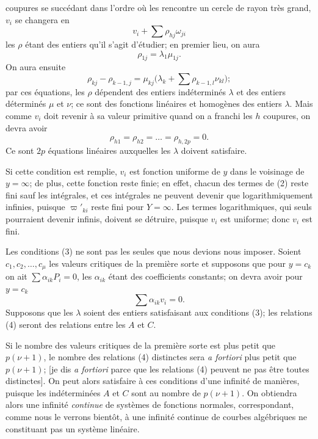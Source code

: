 \documentclass{article}
\begin{document}
coupures se succédant dans l'ordre où les rencontre un cercle de rayon très grand, $v_{i}$ se changera en
\[
v_{i} + \sum \rho_{hj} \omega_{ji}
\]
les $\rho$ étant des entiers qu'il s'agit d'étudier; en premier lieu, on aura
\[
\rho_{1j} = \lambda_{1} \mu_{1j}.
\]
On aura ensuite
\[
\rho_{kj} - \rho_{k-1, j} = \mu_{kj} \biggl( \lambda_{k} + \sum \rho_{k-1, l} \nu_{kl} \biggr);
\]
par ces équations, les $\rho$ dépendent des entiers indéterminés $\lambda$ et des entiers déterminés $\mu$ et $\nu$; ce sont des fonctions linéaires et homogènes des entiers $\lambda$. Mais comme $v_{i}$ doit revenir à sa valeur primitive quand on a franchi les $h$ coupures, on devra avoir
\[
\rho_{h1} = \rho_{h2} = \ldots = \rho_{h, 2p} = 0. \tag{3}
\]
Ce sont $2p$ équations linéaires auxquelles les $\lambda$ doivent satisfaire.

Si cette condition est remplie, $v_{i}$ est fonction uniforme de $y$ dans le voisinage de $y = \infty$; de plus, cette fonction reste finie; en effet, chacun des termes de (2) reste fini sauf les intégrales, et ces intégrales ne peuvent devenir que logarithmiquement infinies, puisque $\varpi'_{ki}$ reste fini pour $Y = \infty$. Les termes logarithmiques, qui seuls pourraient devenir infinis, doivent se détruire, puisque $v_{i}$ est uniforme; donc $v_{i}$ est fini.

Les conditions (3) ne sont pas les seules que nous devions nous imposer. Soient $c_{1}, c_{2}, \ldots, c_{\mu}$ les valeurs critiques de la première sorte et supposons que pour $y = c_{k}$ on ait $\displaystyle\sum \alpha_{ik} P_{i} = 0$, les $\alpha_{ik}$ étant des coefficients constants; on devra avoir pour $y = c_{k}$
\[
\sum \alpha_{ik} v_{i} = 0. \tag{4}
\]
Supposons que les $\lambda$ soient des entiers satisfaisant aux conditions (3); les relations (4) seront des relations entre les $A$ et $C$.

Si le nombre des valeurs critiques de la première sorte est plus petit que $p(\nu + 1)$, le nombre des relations (4) distinctes sera \emph{a fortiori} plus petit que $p(\nu + 1)$; [je dis \emph{a fortiori} parce que les relations (4) peuvent ne pas être toutes distinctes]. On peut alors satisfaire à ces conditions d'une infinité de manières, puisque les indéterminées $A$ et $C$ sont au nombre de $p(\nu + 1)$. On obtiendra alors une infinité \emph{continue} de systèmes de fonctions normales, correspondant, comme nous le verrons bientôt, à une infinité continue de courbes algébriques ne constituant pas un système linéaire.
\end{document}
